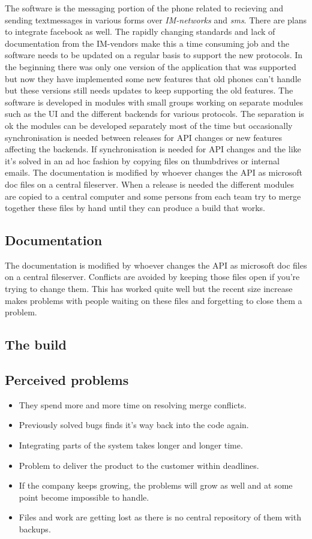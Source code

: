 \documentclass[a4paper,10pt]{article}
\begin{document}
The software is the messaging portion of the phone related to recieving and sending textmessages in various forms over \emph{IM-networks} and  \emph{sms}. There are plans to integrate facebook as well.
The rapidly changing standards and lack of documentation from the IM-vendors make this a time consuming job and the software needs to be updated on a regular basis to support the new protocols.
In the beginning there was only one version of the application that was supported but now they have implemented some new features that old phones can't handle but these versions still needs updates to keep supporting the old features.
The software is developed in modules with small groups working on separate modules such as the UI and the different backends for various protocols.
The separation is ok the modules can be developed separately most of the time but occasionally synchronisation is needed between releases for API changes or new features affecting the backends.
If synchronisation is needed for API changes and the like it's solved in an ad hoc fashion by copying files on thumbdrives or internal emails.
The documentation is modified by whoever changes the API as microsoft doc files on a central fileserver.
When a release is needed the different modules are copied to a central computer and some persons from each team try to merge together these files by hand until they can produce a build that works.

\subsection{Documentation}
The documentation is modified by whoever changes the API as microsoft doc files on a central fileserver.
Conflicts are avoided by keeping those files open if you're trying to change them.
This has worked quite well but the recent size increase makes problems with people waiting on these files and forgetting to close them a problem.

\subsection{The build}


\subsection{Perceived problems}

\begin{itemize}
\item They spend more and more time on resolving merge conflicts.
\item Previously solved bugs finds it’s way back into the code again.
\item Integrating parts of the system takes longer and longer time.
\item Problem to deliver the product to the customer within deadlines.
\item If the company keeps growing, the problems will grow as well and at some point become impossible to handle.
\item Files and work are getting lost as there is no central repository of them with backups.
\end{itemize}
\end{document}
